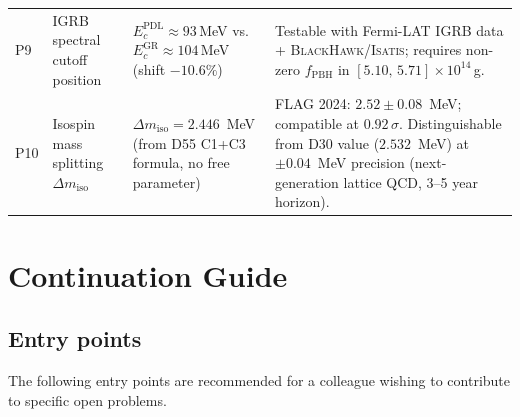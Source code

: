 \documentclass[11pt,a4paper]{article}
\theoremstyle{plain}
\theoremstyle{definition}
\theoremstyle{remark}
\begin{document}
\begin{longtable}{L{0.5cm}L{3.2cm}L{5.2cm}L{4.2cm}}
P9 & IGRB spectral cutoff position & $E_c^{\mathrm{PDL}} \approx 93$\,MeV vs.\ $E_c^{\mathrm{GR}} \approx 104$\,MeV (shift $-10.6\%$) & Testable with Fermi-LAT IGRB data + \textsc{BlackHawk}/\textsc{Isatis}; requires non-zero $f_{\mathrm{PBH}}$ in $[5.10,\,5.71]\times10^{14}$\,g.\\[0.4em]
P10 & Isospin mass splitting $\Delta m_{\mathrm{iso}}$ & $\Delta m_{\mathrm{iso}} = 2.446$~MeV (from D55 C1+C3 formula, no free parameter) & FLAG 2024: $2.52 \pm 0.08$~MeV; compatible at $0.92\,\sigma$. Distinguishable from D30 value ($2.532$~MeV) at $\pm 0.04$~MeV precision (next-generation lattice QCD, 3--5 year horizon).\\[0.4em]
\end{longtable}

\section{Continuation Guide}
\label{sec:continuation}

\subsection{Entry points}
\label{subsec:entrypoints}
The following entry points are recommended for a colleague wishing to contribute to specific open problems.
\end{document}
